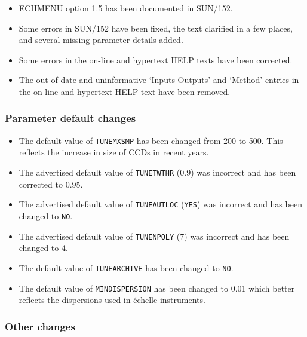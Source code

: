 \documentclass[twoside,11pt]{article}
\newcommand{\htmlref}[2]{#1}
\renewcommand{\_}{\texttt{\symbol{95}}}
\begin{document}
\begin{itemize}
\item ECHMENU option 1.5 has been documented in SUN/152.
\item Some errors in SUN/152 have been fixed, the text clarified in
   a few places, and several missing parameter details added.
\item Some errors in the on-line and hypertext HELP texts have been
   corrected.
\item The out-of-date and uninformative `Inputs-Outputs' and `Method'
   entries in the on-line and hypertext HELP text have been removed.
\end{itemize}

\subsubsection{Parameter default changes}

\begin{itemize}
\item The default value of \htmlref{{\tt{TUNE\_MXSMP}}}{par_TUNE_MXSMP}
   has been changed from 200 to 500.
   This reflects the increase in size of CCDs in recent years.
\item The advertised default value of
   \htmlref{{\tt{TUNE\_TWTHR}}}{par_TUNE_TWTHR} (0.9) was incorrect and
   has been corrected to 0.95.
\item The advertised default value of
   \htmlref{{\tt{TUNE\_AUTLOC}}}{par_TUNE_AUTLOC} (\texttt{YES}) was
   incorrect and has been changed to \texttt{NO}.
\item The advertised default value of
   \htmlref{{\tt{TUNE\_NPOLY}}}{par_TUNE_NPOLY}
   (7) was incorrect and has been changed to 4.
\item The default value of \htmlref{{\tt{TUNE\_ARCHIVE}}}{par_TUNE_ARCHIVE}
   has been changed to \texttt{NO}.
\item The default value of \htmlref{{\tt{MIN\_DISPERSION}}}{par_MIN_DISPERSION}
   has been changed to 0.01 which better reflects the dispersions used in
   \'{e}chelle instruments.
\end{itemize}

\subsubsection{Other changes}
\end{document}
